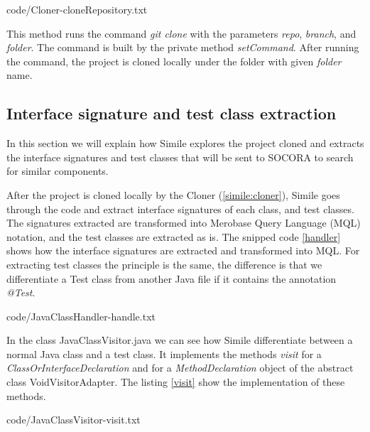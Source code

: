 {
{code/Cloner-cloneRepository.txt}

This method runs the command \emph{git clone} with the parameters \emph{repo}, \emph{branch}, and \emph{folder}. The command is built by the private method \emph{setCommand}. After running the command, the project is cloned locally under the folder with given \emph{folder} name.

\subsection{Interface signature and test class extraction}
\label{simile:code-analysis}
In this section we will explain how Simile explores the project cloned and extracts the interface signatures and test classes that will be sent to SOCORA to search for similar components.

After the project is cloned locally by the Cloner (\ref{simile:cloner}), Simile goes through the code and extract interface signatures of each class, and test classes. The signatures extracted are transformed into Merobase Query Language (MQL) notation, and the test classes are extracted as is. The snipped code \ref{handler} shows how the interface signatures are extracted and transformed into MQL. For extracting test classes the principle is the same, the difference is that we differentiate a Test class from another Java file if it contains the annotation \emph{@Test}.


{code/JavaClassHandler-handle.txt}

In the class JavaClassVisitor.java we can see how Simile differentiate between a normal Java class and a test class. It implements the methods \emph{visit} for a \emph{ClassOrInterfaceDeclaration} and for a \emph{MethodDeclaration} object of the abstract class VoidVisitorAdapter. The listing \ref{visit} show the implementation of these methods.


{code/JavaClassVisitor-visit.txt}

}
